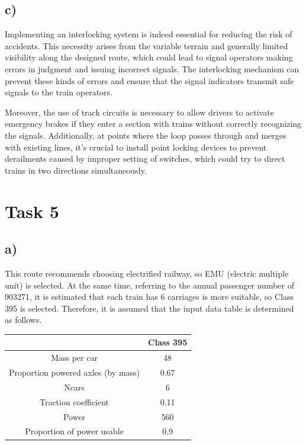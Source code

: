 \documentclass[letterpaper,12pt,leqno]{article}
\begin{document}
\subsection{c)}
Implementing an interlocking system is indeed essential for reducing the risk of accidents. This necessity arises from the variable terrain and generally limited visibility along the designed route, which could lead to signal operators making errors in judgment and issuing incorrect signals. The interlocking mechanism can prevent these kinds of errors and ensure that the signal indicators transmit safe signals to the train operators.

Moreover, the use of track circuits is necessary to allow drivers to activate emergency brakes if they enter a section with trains without correctly recognizing the signals. Additionally, at points where the loop passes through and merges with existing lines, it's crucial to install point locking devices to prevent derailments caused by improper setting of switches, which could try to direct trains in two directions simultaneously.

\section{Task 5}

\subsection{a)}

This route recommends choosing electrified railway, so EMU (electric multiple unit) is selected. At the same time, referring to the annual passenger number of 903271, it is estimated that each train has 6 carriages is more suitable, so Class 395 is selected.
Therefore, it is assumed that the input data table is determined as follows.

\begin{center}
	\begin{tabular}{|c|c|}
		\hline
		& Class 395 \\
		\hline
		Mass per car & 48 \\
		\hline
		Proportion powered axles (by mass) & 0.67 \\
		\hline
		Ncars & 6 \\
		\hline
		Traction coefficient & 0.11 \\
		\hline
		Power & 560 \\
		\hline
		Proportion of power usable & 0.9 \\
		\hline
	\end{tabular}
\end{center}
\end{document}
